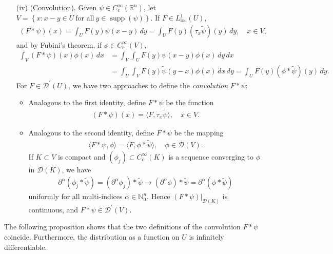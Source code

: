 \documentclass{article}
\numberwithin{equation}{section}
\newcommand{\bbN}{\mathbb{N}}
\newcommand{\bbR}{\mathbb{R}}
\renewcommand{\cal}{\mathcal}
\newcommand{\loc}{\mathrm{loc}}
\newcommand{\wt}{\widetilde}
\DeclareMathOperator{\supp}{supp}
\theoremstyle{plain}
\theoremstyle{definition}
\begin{document}
\begin{itemize}
\item[(iv)] (Convolution). Given $\psi\in C_c^\infty(\bbR^n)$, let $V=\left\{x:x-y\in U\ \text{for all}\ y\in\supp(\psi)\right\}$. If $F\in L^1_\loc(U)$,
\begin{align*}
   	(F*\psi)(x)=\int_U F(y)\psi(x-y)\,dy=\int_U F(y)(\tau_x\wt\psi)(y)\,dy,\quad x\in V,
\end{align*}
and by Fubini's theorem, if $\phi\in C_c^\infty(V)$,
\begin{align*}
	\int_V (F*\psi)(x)\phi(x)\,dx&=\int_V\int_U F(y)\psi(x-y)\phi(x)\,dy\,dx\\
	&=\int_U\int_V F(y)\wt\psi(y-x)\phi(x)\,dx\,dy=\int_U F(y)(\phi*\wt{\psi})(y)\,dy.
\end{align*}
For $F\in\cal{D}^\prime(U)$, we have two approaches to define the \textit{convolution} $F*\psi$:
\begin{itemize}
	\item Analogous to the first identity, define $F*\psi$ be the function
	\begin{align*}
		(F*\psi)(x)=\langle F,\tau_x\wt\psi\rangle,\quad x\in V.
	\end{align*}
\item Analogous to the second identity, define $F*\psi$ be the mapping
\begin{align*}
	\langle F*\psi,\phi\rangle=\langle F,\phi*\wt\psi\rangle,\quad\phi\in\cal{D}(V).
\end{align*}
If $K\subset V$ is compact and $(\phi_j)\subset C_c^\infty(K)$ is a sequence converging to $\phi$ in $\cal{D}(K)$, we have 
\begin{align*}
	\partial^\alpha(\phi_j*\wt\psi)=(\partial^\alpha\phi_j)*\wt\psi\to(\partial^\alpha\phi)*\wt\psi=\partial^\alpha(\phi*\wt\psi)
\end{align*}
uniformly for all multi-indices $\alpha\in\bbN_0^n$. Hence $(F*\psi)|_{\cal{D}(K)}$ is continuous, and $F*\psi\in\cal{D}^\prime(V)$.
\end{itemize}
\end{itemize}

The following proposition shows that the two definitions of the convolution $F*\psi$ coincide. Furthermore, the distribution as a function on $U$ is infinitely differentiable.
\end{document}
